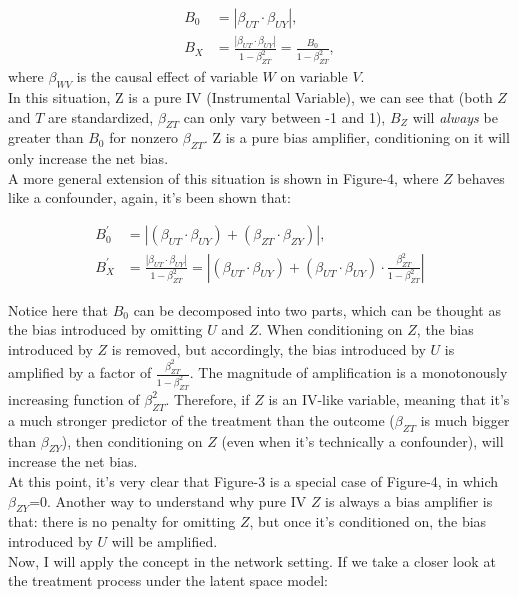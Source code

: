 \documentclass[11pt]{article}
\begin{document}
\begin{align*}
B_0 &= |\beta_{UT} \cdot \beta_{UY}|,\\
B_X &= \frac{|\beta_{UT} \cdot \beta_{UY}|}{1-\beta_{ZT}^2} = 
\frac{B_0}{1-\beta_{ZT}^2},
\end{align*}
where $\beta_{WV}$ is the causal effect of variable $W$ on variable $V$.\\

In this situation, Z is a pure IV (Instrumental Variable), we can see that (both $Z$ and $T$ are standardized, $\beta_{ZT}$ can only vary between -1 and 1), $B_Z$ will \emph{always} be greater than $B_0$ for nonzero $\beta_{ZT}$. Z is a pure bias amplifier, conditioning on it will only increase the net bias.\\

A more general extension of this situation is shown in Figure-4, where $Z$ behaves like a confounder, again, it's been shown that:

\begin{align*}
B_0^{\prime} &= |(\beta_{UT} \cdot \beta_{UY}) + (\beta_{ZT} \cdot \beta_{ZY})|,\\
B_X^{\prime} &= \frac{|\beta_{UT} \cdot \beta_{UY}|}{1-\beta_{ZT}^2} = |(\beta_{UT} \cdot \beta_{UY}) + (\beta_{UT} \cdot \beta_{UY})\cdot \frac{\beta_{ZT}^2}{1-\beta_{ZT}^2}|
\end{align*}

Notice here that $B_0$ can be decomposed into two parts, which can be thought as the bias introduced by omitting $U$ and $Z$. When conditioning on $Z$, the bias introduced by $Z$ is removed, but accordingly, the bias introduced by $U$ is amplified by a factor of $\frac{\beta_{ZT}^2}{1-\beta_{ZT}^2}$. The magnitude of amplification is a monotonously increasing function of $\beta_{ZT}^2$. Therefore, if $Z$ is an IV-like variable, meaning that it's a much stronger predictor of the treatment than the outcome ($\beta_{ZT}$ is much bigger than $\beta_{ZY}$), then conditioning on $Z$ (even when it's technically a confounder), will increase the net bias.\\  

At this point, it's very clear that Figure-3 is a special case of Figure-4, in which $\beta_{ZY}$=0. Another way to understand why pure IV $Z$ is always a bias amplifier is that: there is no penalty for omitting $Z$, but once it's conditioned on, the bias introduced by $U$ will be amplified.\\

Now, I will apply the concept in the network setting. If we take a closer look at the treatment process under the latent space model: 
\end{document}
